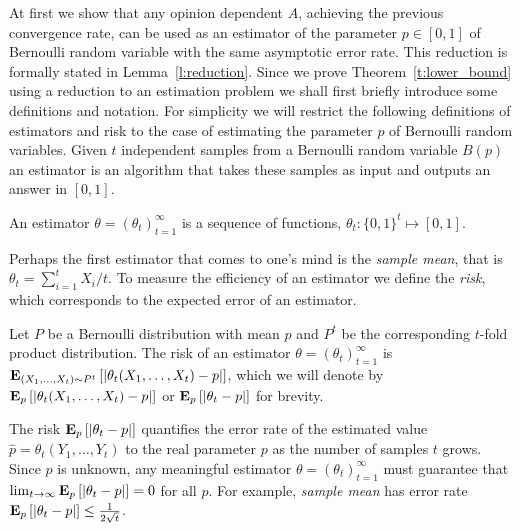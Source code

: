 At first we show that any opinion dependent $A$, achieving the previous
convergence rate, can be used as an estimator of the parameter
$p \in [0,1] $ of Bernoulli random variable with the same asymptotic error
rate. This reduction is formally stated in Lemma~\ref{l:reduction}.
Since we prove Theorem~\ref{t:lower_bound} using a reduction to
an estimation problem we shall first briefly introduce some definitions and
notation. For simplicity we will restrict the following definitions
of estimators and risk to the case of estimating the parameter $p$ of Bernoulli
random variables.
Given $t$ independent samples from a Bernoulli random variable $B(p)$
an estimator is an algorithm that takes these samples as input and
outputs an answer in $[0,1]$.
\begin{definition}\label{d:estimator}
  An estimator $\theta=(\theta_t)_{t=1}^{\infty}$
  is a sequence of functions, $\theta_t: \{0,1\}^t\mapsto [0,1]$.
\end{definition}
Perhaps the first estimator that comes to one's mind is the
\emph{sample mean}, that is $\theta_t = \sum_{i=1}^t X_i/t$.
To measure the efficiency of an estimator we define the \emph{risk},
which corresponds to the expected error of an estimator.
\begin{definition}\label{d:risk}
  Let $P$ be a Bernoulli distribution with mean $p$ and
  $P^t$ be the corresponding $t$-fold product distribution.
  The risk of an estimator $\theta =(\theta_t)_{t=1}^\infty$ is
  $\bm{\mathrm{E}}_{(X_1,\ldots,X_t) \sim P^t} \left[ |\theta_t(X_1,\ldots,X_t) - p| \right]$,
  which we will denote by
  $\bm{\mathrm{E}}_{p} \left[ |\theta_t(X_1,\ldots,X_t) - p| \right]$ or
  $\bm{\mathrm{E}}_{p} \left[ |\theta_t - p| \right]$ for brevity.
\end{definition}
The risk $\bm{\mathrm{E}}_{p} \left[ |\theta_t - p| \right]$ quantifies the error rate of
the estimated value $\hat{p} =\theta_t(Y_1,\ldots,Y_t)$ to the
real parameter $p$ as the number of samples $t$ grows.
Since $p$ is unknown, any meaningful estimator $\theta=(\theta_t)_{t=1}^\infty$
must guarantee that $\lim_{t \to \infty} \bm{\mathrm{E}}_{p} \left[ |\theta_t - p| \right]=0$ for all $p$.
For example, \emph{sample mean} has error rate
$\bm{\mathrm{E}}_{p} \left[ |\theta_t-p| \right] \leq \frac{1}{2\sqrt{t}}$.

